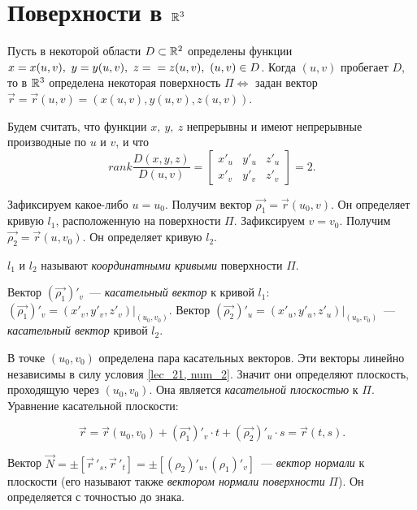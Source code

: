 \documentclass[../../main.tex]{subfiles}
\begin{document}
\section{Поверхности в $\mathbb{R}^3$}
\label{sec:surface-r3}

Пусть в некоторой области $D \subset \mathbb{R}^2$ определены функции 
$x = x(u,v),\ y =y(u,v),\ z = \\ = z(u,v),\ (u,v) \in D$. 
Когда $(u,v)$ пробегает $D$, то в $\mathbb{R}^3$
определена некоторая поверхность $\Pi 
\iff$ задан вектор $\vec{r} = \vec{r}(u,v) = (x(u,v), y(u,v), z(u,v))$.

\begin{center}

\end{center}

Будем считать, что функции $x,\ y,\ z$ непрерывны и 
имеют непрерывные производные по $u$ и $v$, и что
\begin{equation}
\label{lec_21, num_2}
rank \dfrac{D(x,y,z)}{D(u,v)} = 
\begin{bmatrix}
x'_u & y'_u & z'_u \\
x'_v & y'_v & z'_v
\end{bmatrix} = 2.
\end{equation}

Зафиксируем какое-либо $u=u_0$. Получим вектор
$\vec{\rho_1} = \vec{r}(u_0,v)$. 
Он определяет кривую $l_1$, расположенную на поверхности $\Pi$.
Зафиксируем $v = v_0$. Получим $\vec{\rho_2} = \vec{r}(u,v_0)$. 
Он определяет кривую $l_2$.

$l_1$ и $l_2$ называют \emph{координатными кривыми} поверхности $\Pi$.

Вектор $(\vec{\rho_1})'_v$~--- \emph{касательный вектор} к кривой $l_1$:
$(\vec{\rho_1})'_v = (x'_v, y'_v, z'_v) \Big|_{(u_0,v_0)}.$
Вектор $(\vec{\rho_2})'_u = (x'_u, y'_u, z'_u) \Big|_{(u_0,v_0)}$~--- 
\emph{касательный вектор} кривой $l_2$. 

В точке $(u_0, v_0)$ определена пара касательных векторов.
Эти векторы линейно независимы в силу условия \eqref{lec_21, num_2}. 
Значит они определяют плоскость, проходящую через $(u_0,v_0)$.
Она является \emph{касательной плоскостью} к $\Pi$. 
Уравнение касательной плоскости:

\[\vec{r} = \vec{r}(u_0,v_0) + (\vec{\rho_1})'_v \cdot t +
(\vec{\rho_2})'_u \cdot s = 
\vec{r}(t,s)
.\]

Вектор $\vec{N} = \pm \left[ \vec r\,'_s, \vec r\,'_t \right] = 
\pm \left[ (\rho_2)'_u, (\rho_1)'_v  \right]$~--- 
\emph{вектор нормали} к плоскости 
(его называют также \emph{вектором нормали поверхности} $\Pi$).
Он определяется с точностью до знака.
\end{document}

